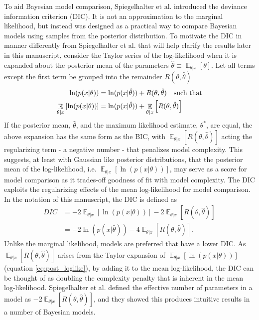 \documentclass{article}
\DeclareMathOperator{\Ex}{\mathbb{E}}%
\begin{document}
To aid Bayesian model comparison, Spiegelhalter et al. introduced the deviance information criterion (DIC). It is not an approximation to the marginal likelihood, but instead was designed as a practical way to compare Bayesian models using samples from the posterior distribution. To motivate the DIC in manner differently from Spiegelhalter et al. that will help clarify the results later in this manuscript, consider the Taylor series of the log-likelihood when it is expanded about the posterior mean of the parameters $\hat{\theta} \equiv \Ex_{\theta | x} [\theta]$. Let all terms except the first term be grouped into the remainder $R(\theta,\hat{\theta})$
\begin{align}
    \ln(p(x|\theta)) &= \ln(p(x|\hat{\theta})) + R(\theta, \hat{\theta}) \text{\, \, such that} \notag\\
    \Ex_{\theta | x} \left[ \ln(p(x|\theta)) \right] &= \ln(p(x|\hat{\theta})) + \Ex_{\theta | x} \left[ R(\theta, \hat{\theta}) \right]
    \label{eq:post_loglike}
\end{align}
If the posterior mean, $\hat{\theta}$, and the maximum likelihood estimate, $\theta^*$, are equal, the above expansion has the same form as the BIC, with $\Ex_{\theta | x} [  R(\theta, \hat{\theta}) ]$ acting the  regularizing term - a negative number - that penalizes model complexity. This suggests, at least with Gaussian like posterior distributions, that the posterior mean of the log-likelihood, i.e. $\Ex_{\theta | x} [ \ln(p(x|\theta))]$, may serve as a score for model comparison as it trades-off goodness of fit with model complexity. The DIC exploits the regularizing effects of the mean log-likelihood for model comparison. In the notation of this manuscript, the DIC is defined as 
\begin{align}
    DIC &= -2  \Ex_{\theta | x} \left[  \ln(p(x|\theta)) \right] - 2 \Ex_{\theta | x} \left[ R(\theta, \hat{\theta}) \right] \\
    &=-2\ln(p(x|\hat{\theta})) - 4\Ex_{\theta | x} \left[ R(\theta, \hat{\theta}) \right] .
    \label{eq:dic}
\end{align}
Unlike the marginal likelihood, models are preferred that have a lower DIC. As $\Ex_{\theta | x} [  R(\theta, \hat{\theta}) ]$ arises from the Taylor expansion of $\Ex_{\theta | x} [ \ln(p(x|\theta)) ]$ (equation \ref{eq:post_loglike}), by adding it to the mean log-likelihood, the DIC can be thought of as doubling the complexity penalty that is inherent in the  mean log-likelihood. Spiegelhalter et al. defined the effective number of parameters in a model as $-2 \Ex_{\theta | x} [ R(\theta, \hat{\theta}) ]$, and they showed this produces intuitive results in a number of Bayesian models. 
\end{document}

